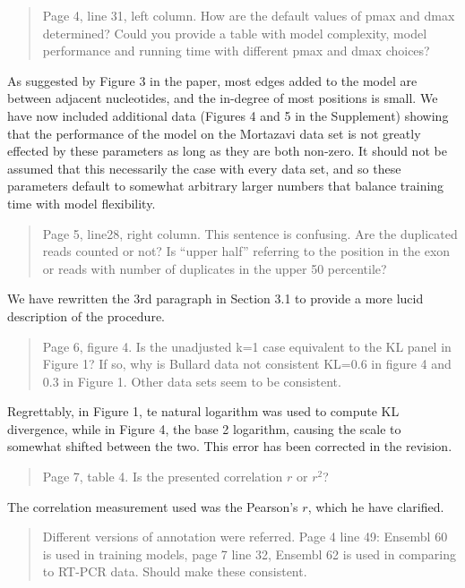 \documentclass{article}
\begin{document}
\begin{quote}
Page 4, line 31, left column. How are the default values of pmax and dmax
determined? Could you provide a table with model complexity, model performance
and running time with different pmax and dmax choices?
\end{quote}

As suggested by Figure 3 in the paper, most edges added to the model are between
adjacent nucleotides, and the in-degree of most positions is small.  We have now
included additional data (Figures 4 and 5 in the Supplement) showing that the
performance of the model on the Mortazavi data set is not greatly effected by
these parameters as long as they are both non-zero. It should not be assumed
that this necessarily the case with every data set, and so these parameters
default to somewhat arbitrary larger numbers that balance training time with
model flexibility.


\begin{quote}
Page 5, line28, right column. This sentence is confusing. Are the duplicated
reads counted or not? Is ``upper half'' referring to the position in the exon or
reads with number of duplicates in the upper 50 percentile?
\end{quote}

We have rewritten the 3rd paragraph in Section 3.1 to provide a more lucid
description of the procedure.


\begin{quote}
Page 6, figure 4. Is the unadjusted k=1 case equivalent to the KL panel in
Figure 1? If so, why is Bullard data not consistent KL=0.6 in figure 4 and 0.3
in Figure 1. Other data sets seem to be consistent.
\end{quote}

Regrettably, in Figure 1, te natural logarithm was used to compute KL
divergence, while in Figure 4, the base 2 logarithm, causing the scale to
somewhat shifted between the two. This error has been corrected in the revision.


\begin{quote}
Page 7, table 4. Is the presented correlation $r$ or $r^2$?
\end{quote}

The correlation measurement used was the Pearson's $r$, which he have clarified.


\begin{quote}
Different versions of annotation were referred. Page 4 line 49: Ensembl 60 is
used in training models, page 7 line 32, Ensembl 62 is used in comparing to
RT-PCR data. Should make these consistent.
\end{quote}
\end{document}
